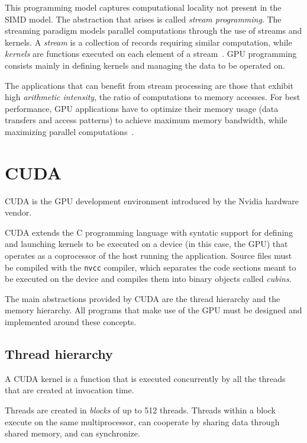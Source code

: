 This programming model captures computational locality not present in the SIMD model.
The abstraction that arises is called \emph{stream programming}.
The streaming paradigm models parallel computations through the use of streams and kernels.
A \emph{stream} is a collection of records requiring similar computation,
while \emph{kernels} are functions executed on each element of a stream~\cite[\S2.1]{buck04}.
GPU programming consists mainly in defining kernels
and managing the data to be operated on.

The applications that can benefit from stream processing
are those that exhibit high \emph{arithmetic intensity},
the ratio of computations to memory accesses.
For best performance,
GPU applications have to optimize their memory usage
(data transfers and access patterns)
to achieve maximum memory bandwidth,
while maximizing parallel computations~\cite[\S5.5]{cudaprog2}.

\section{CUDA}

CUDA is the GPU development environment
introduced by the Nvidia hardware vendor.

CUDA extends the C programming language
with syntatic support for defining and launching kernels
to be executed on a device (in this case, the GPU)
that operates as a coprocessor of the host running the application.
Source files must be compiled with the \texttt{nvcc} compiler,
which separates the code sections meant to be executed on the device
and compiles them into binary objects called \emph{cubins}.

The main abstractions provided by CUDA
are the thread hierarchy and the memory hierarchy.
All programs that make use of the GPU
must be designed and implemented around these concepts.

\subsection{Thread hierarchy}
\label{sub:thread-hierarchy}

A CUDA kernel is a function
that is executed concurrently
by all the threads that are created
at invocation time.

Threads are created in \emph{blocks}
of up to 512 threads.
Threads within a block
execute on the same multiprocessor,
can cooperate by sharing data through shared memory,
and can synchronize.

